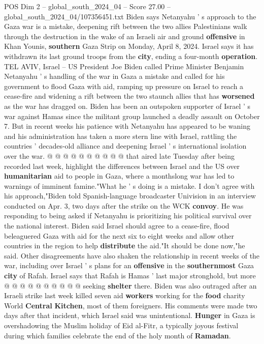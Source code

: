 \begin{textsample}{POS Dim 2 – global\_south\_2024\_04 – Score 27.00 – global\_south\_2024\_04/107356451.txt}  \label{ex:f2_pos_153}
Biden says Netanyahu ' s approach to the Gaza war is a mistake, deepening rift between the two allies Palestinians walk through the destruction in the wake of an Israeli air and ground \textbf{offensive} in Khan Younis, \textbf{southern} Gaza Strip on Monday, April 8, 2024.
Israel says it has withdrawn its last ground troops from the \textbf{city}, ending a four-month \textbf{operation}.
TEL AVIV, Israel -- US President Joe Biden called Prime Minister Benjamin Netanyahu ' s handling of the war in Gaza a mistake and called for his government to flood Gaza with aid, ramping up pressure on Israel to reach a cease-fire and widening a rift between the two staunch allies that has \textbf{worsened} as the war has dragged on.
Biden has been an outspoken supporter of Israel ' s war against Hamas since the militant group launched a deadly assault on October 7.
But in recent weeks his patience with Netanyahu has appeared to be waning and his administration has taken a more stern line with Israel, rattling the countries ' decades-old alliance and deepening Israel ' s international isolation over the war. @ @ @ @ @ @ @ @ @ @ that aired late Tuesday after being recorded last week, highlight the differences between Israel and the US over \textbf{humanitarian} aid to people in Gaza, where a monthslong war has led to warnings of imminent famine."What he ' s doing is a mistake.
I don't agree with his approach,"Biden told Spanish-language broadcaster Univision in an interview conducted on Apr. 3, two days after the strike on the WCK \textbf{convoy}.
He was responding to being asked if Netanyahu is prioritizing his political survival over the national interest.
Biden said Israel should agree to a cease-fire, flood beleaguered Gaza with aid for the next six to eight weeks and allow other countries in the region to help \textbf{distribute} the aid."It should be done now,"he said.
Other disagreements have also shaken the relationship in recent weeks of the war, including over Israel ' s plans for an \textbf{offensive} in the \textbf{southernmost} Gaza \textbf{city} of Rafah.
Israel says that Rafah is Hamas ' last major stronghold, but more @ @ @ @ @ @ @ @ @ @ seeking \textbf{shelter} there.
Biden was also outraged after an Israeli strike last week killed seven aid \textbf{workers} working for the \textbf{food} charity World \textbf{Central} \textbf{Kitchen}, most of them foreigners.
His comments were made two days after that incident, which Israel said was unintentional. \textbf{Hunger} in Gaza is overshadowing the Muslim holiday of Eid al-Fitr, a typically joyous festival during which families celebrate the end of the holy month of \textbf{Ramadan}.

\end{textsample}
